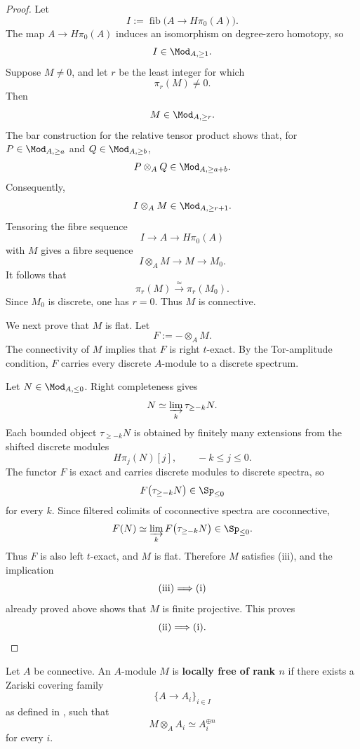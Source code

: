 \begin{proof}
Let
\[
    I
    :=
    \operatorname{fib}
    \bigl(
        A\longrightarrow H\pi_0(A)
    \bigr).
\]
The map \(A\to H\pi_0(A)\) induces an isomorphism on degree-zero
homotopy, so
\[
    I\in\Mod_{A,\geq1}.
\]
Suppose \(M\neq0\), and let \(r\) be the least integer for which
\[
    \pi_r(M)\neq0.
\]
Then
\[
    M\in\Mod_{A,\geq r}.
\]
The bar construction for the relative tensor product shows that, for
\(P\in\Mod_{A,\geq a}\) and \(Q\in\Mod_{A,\geq b}\),
\[
    P\otimes_AQ
    \in
    \Mod_{A,\geq a+b}.
\]
Consequently,
\[
    I\otimes_AM
    \in
    \Mod_{A,\geq r+1}.
\]
Tensoring the fibre sequence
\[
    I
    \longrightarrow
    A
    \longrightarrow
    H\pi_0(A)
\]
with \(M\) gives a fibre sequence
\[
    I\otimes_AM
    \longrightarrow
    M
    \longrightarrow
    M_0.
\]
It follows that
\[
    \pi_r(M)
    \xrightarrow{\simeq}
    \pi_r(M_0).
\]
Since \(M_0\) is discrete, one has \(r=0\). Thus \(M\) is connective.

We next prove that \(M\) is flat. Let
\[
    F
    :=
    -\otimes_AM.
\]
The connectivity of \(M\) implies that \(F\) is right \(t\)-exact. By
the Tor-amplitude condition, \(F\) carries every discrete \(A\)-module
to a discrete spectrum.

Let \(N\in\Mod_{A,\leq0}\). Right completeness gives
\[
    N
    \simeq
    \varinjlim_k\tau_{\geq-k}N.
\]
Each bounded object \(\tau_{\geq-k}N\) is obtained by finitely many
extensions from the shifted discrete modules
\[
    H\pi_j(N)[j],
    \qquad
    -k\leq j\leq0.
\]
The functor \(F\) is exact and carries discrete modules to discrete
spectra, so
\[
    F\bigl(\tau_{\geq-k}N\bigr)
    \in
    \Sp_{\leq0}
\]
for every \(k\). Since filtered colimits of coconnective spectra are
coconnective,
\[
    F(N)
    \simeq
    \varinjlim_kF\bigl(\tau_{\geq-k}N\bigr)
    \in
    \Sp_{\leq0}.
\]
Thus \(F\) is also left \(t\)-exact, and \(M\) is flat. Therefore \(M\)
satisfies \textup{(iii)}, and the implication
\[
    \textup{(iii)}
    \Longrightarrow
    \textup{(i)}
\]
already proved above shows that \(M\) is finite projective. This proves
\[
    \textup{(ii)}
    \Longrightarrow
    \textup{(i)}.
\]
\end{proof}

\begin{definition}
\label{def:locally-free-affine-module}
Let $A$ be connective. An $A$-module $M$ is \textbf{locally free of rank
$n$} if there exists a Zariski covering family
\[
    \{A\to A_i\}_{i\in I}
\]
as defined in , such that
\[
    M\otimes_AA_i
    \simeq
    A_i^{\oplus n}
\]
for every $i$.
\end{definition}


